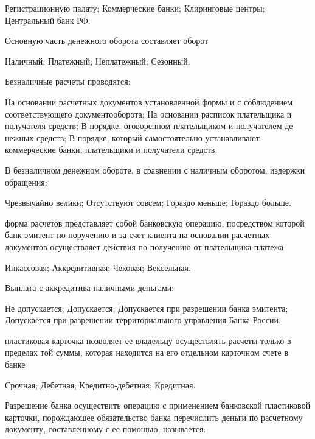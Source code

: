 \documentclass[12pt, table]{exam}
\begin{document}
\begin{questions}
\begin{multicols}{2}
	 \begin{choices}
	 \CC Регистрационную палату;
	 \choice Коммерческие банки;
	 \choice Клиринговые центры;
	 \choice Центральный банк РФ.
	 \end{choices}
\question Основную часть денежного оборота составляет  оборот
	 \begin{choices}
	 \choice Наличный;
	 \choice Платежный;
	 \CC Неплатежный;
	 \choice Сезонный.
	 \end{choices}
\question Безналичные расчеты проводятся:
	 \begin{choices}
	 \choice На основании расчетных документов установленной формы и с соблюдением соответствующего документооборота;
	 \choice На основании расписок плательщика и получателя средств;
	 \choice В порядке, оговоренном плательщиком и получателем де нежных средств;
	 \CC В порядке, который самостоятельно устанавливают коммерческие банки, плательщики и получатели средств.
	 \end{choices}
\question В безналичном денежном обороте, в сравнении с наличным оборотом, издержки обращения:
	 \begin{choices}
	 \choice Чрезвычайно велики;
	 \CC Отсутствуют совсем;
	 \choice Гораздо меньше;
	 \choice Гораздо больше.
	 \end{choices}
\question  форма расчетов представляет собой банковскую операцию, посредством которой банк эмитент по поручению и за счет клиента на основании расчетных документов осуществляет действия по получению от плательщика платежа
	 \begin{choices}
	 \choice Инкассовая;
	 \choice Аккредитивная;
	 \CC Чековая;
	 \choice Вексельная.
	 \end{choices}
\question Выплата с аккредитива наличными деньгами:
	 \begin{choices}
	 \choice Не допускается;
	 \CC Допускается;
	 \choice Допускается при разрешении банка эмитента;
	 \choice Допускается при разрешении территориального управления Банка России.
	 \end{choices}
\question  пластиковая карточка позволяет ее владельцу осуществлять расчеты только в пределах той суммы, которая находится на его отдельном карточном счете в банке
	 \begin{choices}
	 \choice Срочная;
	 \CC Дебетная;
	 \choice Кредитно-дебетная;
	 \choice Кредитная.
	 \end{choices}
\question Разрешение банка осуществить операцию с применением банковской пластиковой карточки, порождающее обязательство банка перечислить деньги по расчетному документу, составленному с ее помощью, называется:

\end{multicols}
\end{questions}
\end{document}
